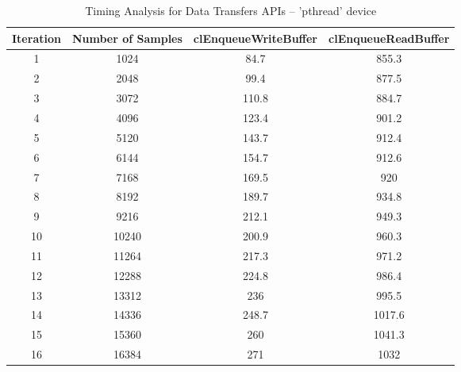 \begin{table}[h]
  \centering
  \begin{adjustbox}{width=0.8\textwidth}
	\small
    \begin{tabular}{|c|c|c|c|}
    \toprule
    Iteration  & Number of Samples & clEnqueueWriteBuffer & clEnqueueReadBuffer \\
    \midrule
    1     & 1024  & 84.7  & 855.3 \\
    2     & 2048  & 99.4  & 877.5 \\
    3     & 3072  & 110.8 & 884.7 \\
    4     & 4096  & 123.4 & 901.2 \\
    5     & 5120  & 143.7 & 912.4 \\
    6     & 6144  & 154.7 & 912.6 \\
    7     & 7168  & 169.5 & 920 \\
    8     & 8192  & 189.7 & 934.8 \\
    9     & 9216  & 212.1 & 949.3 \\
    10    & 10240 & 200.9 & 960.3 \\
    11    & 11264 & 217.3 & 971.2 \\
    12    & 12288 & 224.8 & 986.4 \\
    13    & 13312 & 236   & 995.5 \\
    14    & 14336 & 248.7 & 1017.6 \\
    15    & 15360 & 260   & 1041.3 \\
    16    & 16384 & 271   & 1032 \\
    \bottomrule
    \end{tabular}%
    \end{adjustbox}%
	\caption{Timing Analysis for Data Transfers APIs -- 'pthread' device}
  \label{tab:pthread_Table}%
\end{table}%